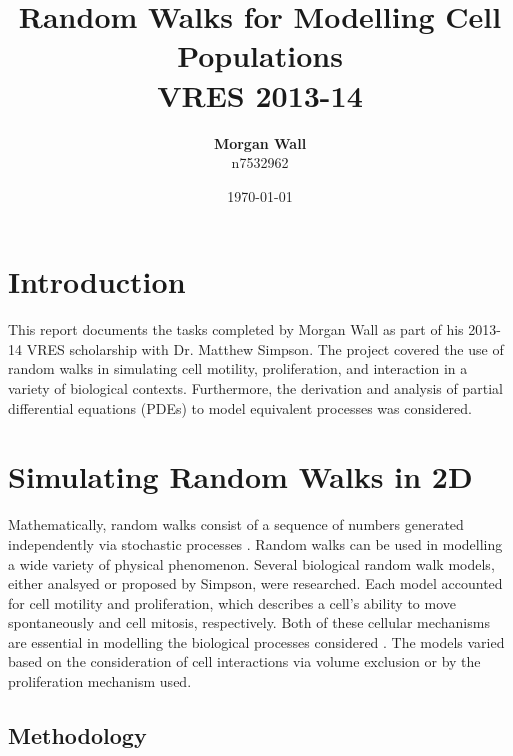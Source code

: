 \documentclass[11pt,titlepage,a4paper]{article}
\title{\textbf{Random Walks for Modelling Cell Populations} \\ VRES 2013-14}
\author{\textbf{Morgan Wall} \\ n7532962}
\date{\today}
\begin{document}

\maketitle






\tableofcontents
\pagebreak


\section{Introduction}
	\label{sec:introduction}
	
	This report documents the tasks completed by Morgan Wall as part of his 2013-14 VRES scholarship with Dr. Matthew Simpson. The project covered the use of random walks in simulating cell motility, proliferation, and interaction in a variety of biological contexts. Furthermore, the derivation and analysis of partial differential equations (PDEs) to model equivalent processes was considered.


\section{Simulating Random Walks in 2D}
	\label{sec:simrandin2d}
	
	Mathematically, random walks consist of a sequence of numbers generated independently via stochastic processes \cite{grinstead1997}. Random walks can be used in modelling a wide variety of physical phenomenon. Several biological random walk models, either analsyed or proposed by Simpson, were researched. Each model accounted for cell motility and proliferation, which describes a cell's ability to move spontaneously and cell mitosis, respectively. Both of these cellular mechanisms are essential in modelling the biological processes considered \cite{simpson2009diffusing,simpson2010cell}. The models varied based on the consideration of cell interactions via volume exclusion or by the proliferation mechanism used.

	\subsection{Methodology}
		\label{sub:methodology}
		
\end{document}

